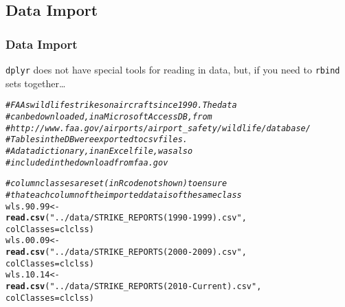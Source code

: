 \documentclass{beamer}\usepackage[]{graphicx}\usepackage[]{color}
\makeatletter
\newcommand{\hlstr}[1]{\textcolor[rgb]{0.192,0.494,0.8}{#1}}%
\newcommand{\hlcom}[1]{\textcolor[rgb]{0.678,0.584,0.686}{\textit{#1}}}%
\newcommand{\hlstd}[1]{\textcolor[rgb]{0.345,0.345,0.345}{#1}}%
\newcommand{\hlkwb}[1]{\textcolor[rgb]{0.69,0.353,0.396}{#1}}%
\newcommand{\hlkwc}[1]{\textcolor[rgb]{0.333,0.667,0.333}{#1}}%
\newcommand{\hlkwd}[1]{\textcolor[rgb]{0.737,0.353,0.396}{\textbf{#1}}}%
\newenvironment{kframe}{%
 \def\at@end@of@kframe{}%
 \ifinner\ifhmode%
  \def\at@end@of@kframe{\end{minipage}}%
  \begin{minipage}{\columnwidth}%
 \fi\fi%
 \def\FrameCommand##1{\hskip\@totalleftmargin \hskip-\fboxsep
 \colorbox{shadecolor}{##1}\hskip-\fboxsep
     \hskip-\linewidth \hskip-\@totalleftmargin \hskip\columnwidth}%
 \MakeFramed {\advance\hsize-\width
   \@totalleftmargin\z@ \linewidth\hsize
   \@setminipage}}%
 {\par\unskip\endMakeFramed%
 \at@end@of@kframe}
\newenvironment{knitrout}{}{} %
\makeatother
\begin{document}
\subsection{Data Import}

\begin{frame}[fragile]
  \frametitle{Data Import}
  {\tt dplyr} does not have special tools for reading in data, but, if you need
  to {\tt rbind} sets together\ldots 



\begin{knitrout}\footnotesize
{}\color{fgcolor}\begin{kframe}
\begin{alltt}
\hlcom{# FAAs wildlife strikes on aircraft since 1990.  The data}
\hlcom{# can be downloaded, in a Microsoft Access DB,  from}
\hlcom{# http://www.faa.gov/airports/airport_safety/wildlife/database/}
\hlcom{# Tables in the DB were exported to csv files.  }
\hlcom{# A data dictionary, in an Excel file, was also}
\hlcom{# included in the download from faa.gov}

\hlcom{# column classes are set (in R code not shown) to ensure}
\hlcom{# that each column of the imported data is of the same class}
\hlstd{wls.90.99} \hlkwb{<-}
  \hlkwd{read.csv}\hlstd{(}\hlstr{"../data/STRIKE_REPORTS (1990-1999).csv"}\hlstd{,}
           \hlkwc{colClasses} \hlstd{= clclss)}
\hlstd{wls.00.09} \hlkwb{<-}
  \hlkwd{read.csv}\hlstd{(}\hlstr{"../data/STRIKE_REPORTS (2000-2009).csv"}\hlstd{,}
           \hlkwc{colClasses} \hlstd{= clclss)}
\hlstd{wls.10.14} \hlkwb{<-}
  \hlkwd{read.csv}\hlstd{(}\hlstr{"../data/STRIKE_REPORTS (2010-Current).csv"}\hlstd{,}
           \hlkwc{colClasses} \hlstd{= clclss)}
\end{alltt}
\end{kframe}
\end{knitrout}
\end{frame} 
\end{document}
